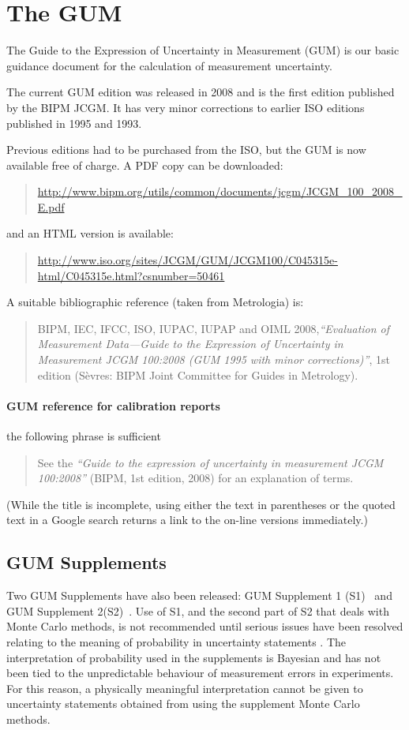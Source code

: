 \section{The GUM}
The Guide to the Expression of Uncertainty in Measurement (GUM) is our basic guidance document for the calculation of measurement uncertainty. 

The current GUM edition was released in 2008 and is the first edition published by the BIPM JCGM. It has very minor corrections to earlier ISO editions published in 1995 and 1993. 

Previous editions had to be purchased from the ISO, but the GUM is now available free of charge. A PDF copy can be downloaded:
\begin{quote}
\url{http://www.bipm.org/utils/common/documents/jcgm/JCGM_100_2008_E.pdf}
\end{quote}
and an HTML version is available:
\begin{quote}
\url{http://www.iso.org/sites/JCGM/GUM/JCGM100/C045315e-html/C045315e.html?csnumber=50461}
\end{quote}

A suitable bibliographic reference (taken from Metrologia) is: 
\begin{quote}
BIPM, IEC, IFCC, ISO, IUPAC, IUPAP and OIML 2008,\textit{``Evaluation of Measurement Data—Guide to the Expression of Uncertainty in Measurement JCGM 100:2008 (GUM 1995 with minor corrections)''}, 1st edition (S\`evres: BIPM Joint Committee for Guides in Metrology). 
\end{quote}

\paragraph{GUM reference for calibration reports}
the following phrase is sufficient
\begin{quote}
See the \textit{``Guide to the expression of uncertainty in measurement JCGM 100:2008''} (BIPM, 1st edition, 2008) for an explanation of terms.
\end{quote}
(While the title is incomplete, using either the text in parentheses or the quoted text in a Google search returns a link to the on-line versions immediately.)

\subsection{GUM Supplements}
Two GUM Supplements have also been released: GUM Supplement 1 (S1)~\cite{GUM_S1} and GUM Supplement 2(S2)~\cite{GUM_S2}. Use of S1, and the second part of S2 that deals with Monte Carlo methods, is not recommended until serious issues have been resolved relating to the meaning of probability in uncertainty statements \cite{WHITE_16}. The interpretation of probability used in the supplements is Bayesian and has not been tied to the unpredictable behaviour of measurement errors in experiments. For this reason, a physically meaningful interpretation cannot be given to uncertainty statements obtained from using the supplement Monte Carlo methods. 

